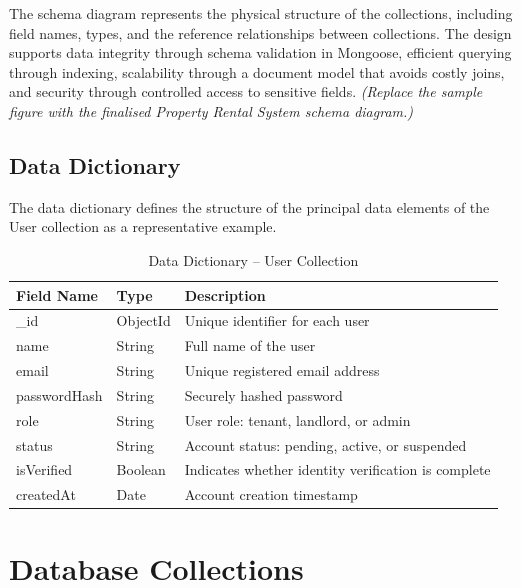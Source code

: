 The schema diagram represents the physical structure of the collections, including field names, types, and the reference relationships between collections. The design supports data integrity through schema validation in Mongoose, efficient querying through indexing, scalability through a document model that avoids costly joins, and security through controlled access to sensitive fields. \textit{(Replace the sample figure with the finalised Property Rental System schema diagram.)}

\subsection{Data Dictionary}

The data dictionary defines the structure of the principal data elements of the User collection as a representative example.

\begin{table}[h]
\centering
\caption{Data Dictionary -- User Collection}
\begin{tabularx}{\textwidth}{|>{\raggedright\arraybackslash}p{3cm}|>{\raggedright\arraybackslash}p{2.5cm}|X|}
\hline
\textbf{Field Name} & \textbf{Type} & \textbf{Description} \\
\hline
\_id & ObjectId & Unique identifier for each user \\
\hline
name & String & Full name of the user \\
\hline
email & String & Unique registered email address \\
\hline
passwordHash & String & Securely hashed password \\
\hline
role & String & User role: tenant, landlord, or admin \\
\hline
status & String & Account status: pending, active, or suspended \\
\hline
isVerified & Boolean & Indicates whether identity verification is complete \\
\hline
createdAt & Date & Account creation timestamp \\
\hline
\end{tabularx}
\end{table}

\section{Database Collections}

